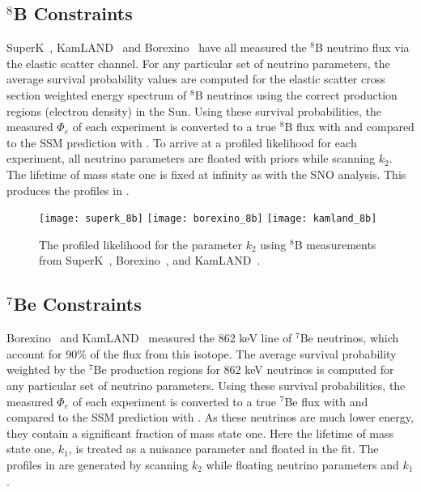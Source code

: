 \subsection{$^8$B Constraints}

SuperK~\cite{superkiv}, KamLAND~\cite{kamland8b} and Borexino~\cite{borexino8b} have all measured the $^8$B neutrino flux via the elastic scatter channel. 
For any particular set of neutrino parameters, the average survival probability values are computed for the elastic scatter cross section weighted energy spectrum of $^8$B neutrinos using the correct production regions (electron density) in the Sun. 
Using these survival probabilities, the measured $\Phi_e$ of each experiment is converted to a true $^8$B flux with  and compared to the SSM prediction with .
To arrive at a profiled likelihood for each experiment, all neutrino parameters are floated with priors while scanning $k_2$. The lifetime of mass state one is fixed at infinity as with the SNO analysis. 
This produces the profiles in .

\begin{figure}
\centering
\texttt{[image: superk\_8b]}
\texttt{[image: borexino\_8b]}
\texttt{[image: kamland\_8b]}
\caption{The profiled likelihood for the parameter $k_2$ using $^8$B measurements from SuperK~\cite{superkiv}, Borexino~\cite{borexino8b}, and KamLAND~\cite{kamland8b}.}
\label{fig:8b_profiles}
\end{figure}

\subsection{$^7$Be Constraints}

Borexino~\cite{borexino7be} and KamLAND~\cite{kamland7be} measured the 862 keV line of $^7$Be neutrinos, which account for $90\%$ of the flux from this isotope. 
The average survival probability weighted by the $^7$Be production regions for 862 keV neutrinos is computed for any particular set of neutrino parameters.
Using these survival probabilities, the measured $\Phi_e$ of each experiment is converted to a true $^7$Be flux with  and compared to the SSM prediction with . 
As these neutrinos are much lower energy, they contain a significant fraction of mass state one. 
Here the lifetime of mass state one, $k_1$, is treated as a nuisance parameter and floated in the fit. 
The profiles in  are generated by scanning $k_2$ while floating neutrino parameters and $k_1$.

